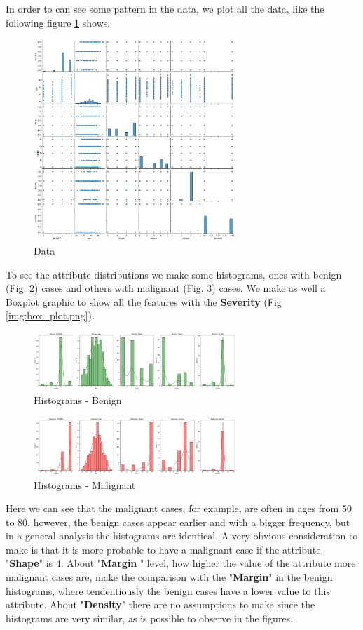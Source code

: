 \documentclass[conference]{IEEEtran}
\begin{document}
In order to can see some pattern in the data, we plot all the data, like the following figure \ref{img:data.png} shows.

\begin{figure}[!h]
    \centering
    \includegraphics[width=3.0in]{data.png}
    \caption{Data}
    \label{img:data.png}
\end{figure}

To see the attribute distributions we make some histograms, ones with benign (Fig. \ref{img:hist_benign.png}) cases and others with malignant (Fig. \ref{img:hist_malignant.png}) cases.
We make as well a Boxplot graphic to show all the features with the \textbf{Severity} (Fig \ref{img:box_plot.png}).

\begin{figure}[!h]
    \centering
    \includegraphics[width=3.0in]{hist_benign.png}
    \caption{Histograms - Benign}
    \label{img:hist_benign.png}
\end{figure}

\begin{figure}[!h]
    \centering
    \includegraphics[width=3.0in]{hist_malignant.png}
    \caption{Histograms - Malignant}
    \label{img:hist_malignant.png}
\end{figure}

Here we can see that the malignant cases, for example, are often in ages from 50 to 80, however, the benign cases appear earlier and with a bigger frequency, but in a general analysis the histograms are identical. A very obvious consideration to make is that it is more probable to have a malignant case if the attribute "\textbf{Shape}" is 4. About "\textbf{Margin} " level, how higher the value of the attribute more malignant cases are, make the comparison with the "\textbf{Margin}" in the benign histograms, where tendentiously the benign cases have a lower value to this attribute. About "\textbf{Density}" there are no assumptions to make since the histograms are very similar, as is possible to observe in the figures.
\end{document}
